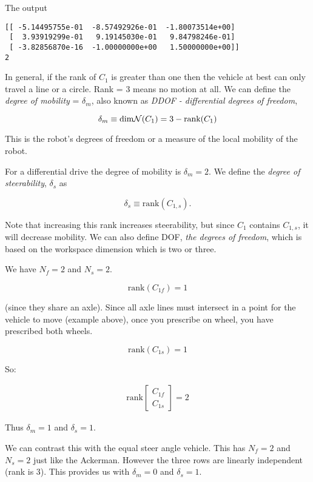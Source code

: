The output

\begin{verbatim}
[[ -5.14495755e-01  -8.57492926e-01  -1.80073514e+00]
 [  3.93919299e-01   9.19145030e-01   9.84798246e-01]
 [ -3.82856870e-16  -1.00000000e+00   1.50000000e+00]]
2
\end{verbatim}

In general, if the rank of \(C_1\) is greater than one then the vehicle
at best can only travel a line or a circle. Rank = 3 means no motion at
all. We can define the \emph{degree of mobility} = \(\delta_m\), also
known as \emph{DDOF - differential degrees of freedom},

\[\delta_m \equiv \mbox{dim} {\cal N}(C_1) = 3 - \mbox{rank}(C_1)\]

This is the robot's degrees of freedom or a measure of the local
mobility of the robot.

For a differential drive the degree of mobility is \(\delta_m = 2\). We
define the \emph{degree of steerability}, \(\delta_s\) as

\[\delta_s \equiv \mbox{rank} (C_{1,s}).\]

Note that increasing this rank increases steerability, but since \(C_1\)
contains \(C_{1,s}\), it will decrease mobility. We can also define DOF,
\emph{the degrees of freedom}, which is based on the workspace dimension
which is two or three.

We have \(N_f = 2\) and \(N_s=2\).

\[\mbox{rank}(C_{1f})=1\]

(since they share an axle). Since all axle lines must intersect in a
point for the vehicle to move (example above), once you prescribe on
wheel, you have prescribed both wheels.

\[\mbox{rank}(C_{1s})=1\]

So:

\[\begin{aligned}
\mbox{rank}\begin{bmatrix} C_{1f} \\ C_{1s}\end{bmatrix} = 2
\end{aligned}\]

Thus \(\delta_m=1\) and \(\delta_s =1\).

We can contrast this with the equal steer angle vehicle. This has
\(N_f = 2\) and \(N_s=2\) just like the Ackerman. However the three rows
are linearly independent (rank is 3). This provides us with
\(\delta_m=0\) and \(\delta_s =1\).

